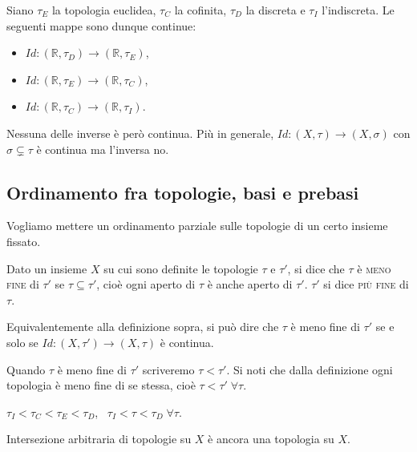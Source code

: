 \documentclass{article}
\begin{document}
\begin{ex}
	Siano $\tau_E$ la topologia euclidea, $\tau_C$ la cofinita, $\tau_D$ la
	discreta e $\tau_I$ l'indiscreta. Le seguenti mappe sono dunque continue:
    \begin{itemize}
	\item $Id:(\mathbb{R}, \tau_D) \rightarrow (\mathbb{R}, \tau_E)$,
    \item $Id:(\mathbb{R}, \tau_E) \rightarrow (\mathbb{R}, \tau_C)$,
    \item $Id:(\mathbb{R}, \tau_C) \rightarrow (\mathbb{R}, \tau_I)$.
    \end{itemize}
    Nessuna delle inverse è però continua. Più in generale, $Id: (X, \tau)
    \rightarrow (X, \sigma)$ con $\sigma \subsetneq \tau$ è continua ma
    l'inversa no.
\end{ex}

\subsection{Ordinamento fra topologie, basi e prebasi}

Vogliamo mettere un ordinamento parziale sulle topologie di un certo insieme
fissato.

\begin{defn}
Dato un insieme $X$ su cui sono definite le topologie $\tau$ e $\tau'$, si dice
che $\tau$ \`e \textsc{meno fine} di $\tau'$ se $\tau \subseteq \tau'$, cioè
ogni aperto di $\tau$ è anche aperto di $\tau'$. $\tau'$ si dice \textsc{più
fine} di $\tau$.
\end{defn}

\begin{oss}
Equivalentemente alla definizione sopra, si pu\`o dire che $\tau$ \`e meno fine
di $\tau'$ se e solo se ${Id:(X,\tau')\rightarrow(X, \tau)}$ \`e continua.
\end{oss}

Quando $\tau$ è meno fine di $\tau'$ scriveremo $\tau < \tau'$. Si noti che
dalla definizione ogni topologia è meno fine di se stessa, cioè $\tau < \tau'
\; \forall \tau$.

\begin{ex}
	$\tau_I < \tau_C < \tau_E < \tau_D$, \, $\tau_I < \tau < \tau_D \; \forall
	\tau$.
\end{ex}

\begin{lm}
	Intersezione arbitraria di topologie su $X$ è ancora una topologia su $X$.
\end{lm}
\end{document}
